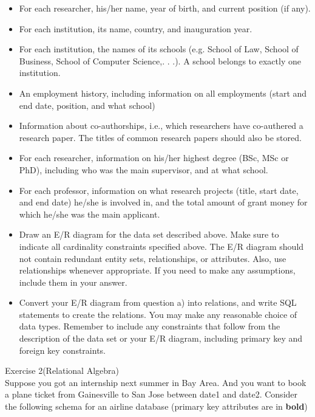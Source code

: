 \documentclass[12pt]{article}
\begin{document}
\begin{itemize}
\item
For each researcher, his/her name, year of birth, and current position (if any). 

\item 
For each institution, its name, country, and inauguration year.

\item 
For each institution, the names of its schools (e.g. School of Law, School of Business,
School of Computer Science,. . .). A school belongs to exactly one institution.

\item 
An employment history, including information on all employments (start and end
date, position, and what school)
\item
Information about co-authorships, i.e., which researchers have co-authered a research
paper. The titles of common research papers should also be stored.

\item
For each researcher, information on his/her highest degree (BSc, MSc or PhD), 
including who was the main supervisor, and at what school.

\item
For each professor, information on what research projects (title, start date, and end
date) he/she is involved in, and the total amount of grant money for which he/she
was the main applicant.
\end{itemize}

\begin{itemize}
\item
Draw an E/R diagram for the data set described above. Make sure to indicate all
cardinality constraints speciﬁed above. The E/R diagram should not contain redundant
entity sets, relationships, or attributes. Also, use relationships whenever appropriate. If
you need to make any assumptions, include them in your answer.
\item
Convert your E/R diagram from question a) into relations, and write SQL statements
to create the relations. You may make any reasonable choice of data types. Remember
to include any constraints that follow from the description of the data set or your E/R
diagram, including primary key and foreign key constraints.
\end{itemize}
 

\newpage
Exercise 2(Relational Algebra)\\
Suppose you got an internship next summer in Bay Area. And you want to book a plane ticket
from Gainesville to San Jose between date1 and date2. Consider the following schema for an airline database
(primary key attributes are in \textbf{bold})
\end{document}
